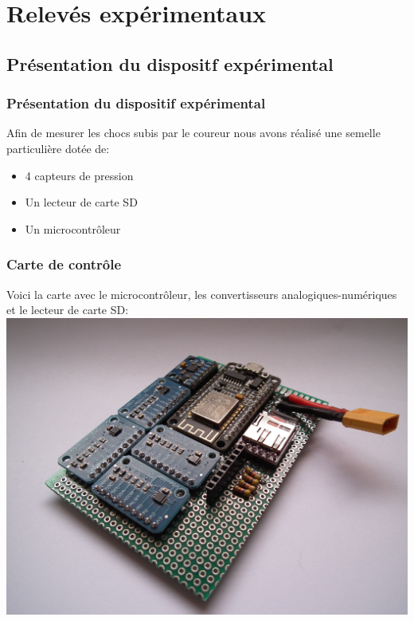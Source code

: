 \section{Relevés expérimentaux}
\subsection{Présentation du dispositf expérimental}
\begin{frame}
    \frametitle{Présentation du dispositif expérimental}
    Afin de mesurer les chocs subis par le coureur nous avons réalisé une semelle particulière dotée de:
    \begin{itemize}
        \item 4 capteurs de pression
        \item Un lecteur de carte SD
        \item Un microcontrôleur
    \end{itemize}
\end{frame}

\begin{frame}
    \frametitle{Carte de contrôle}
    Voici la carte avec le microcontrôleur, les convertisseurs analogiques-numériques et le lecteur de carte SD:
    \includegraphics[width=\textwidth]{./figures/carte_00.jpg}

\end{frame}

